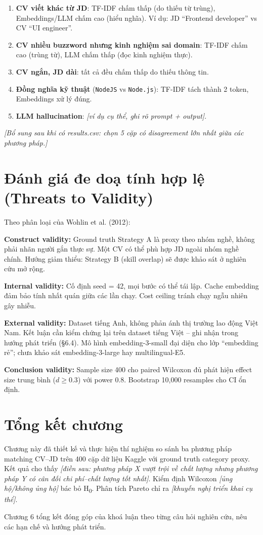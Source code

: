 \documentclass[a4paper,13pt]{report}
\begin{document}
\begin{enumerate}
    \item \textbf{CV viết khác từ JD}: TF-IDF chấm thấp (do thiếu từ trùng), Embeddings/LLM chấm cao (hiểu nghĩa). Ví dụ: JD ``Frontend developer'' vs CV ``UI engineer''.
    \item \textbf{CV nhiều buzzword nhưng kinh nghiệm sai domain}: TF-IDF chấm cao (trùng từ), LLM chấm thấp (đọc kinh nghiệm thực).
    \item \textbf{CV ngắn, JD dài}: tất cả đều chấm thấp do thiếu thông tin.
    \item \textbf{Đồng nghĩa kỹ thuật} (\texttt{NodeJS} vs \texttt{Node.js}): TF-IDF tách thành 2 token, Embeddings xử lý đúng.
    \item \textbf{LLM hallucination}: \textit{[ví dụ cụ thể, ghi rõ prompt + output]}.
\end{enumerate}

\textit{[Bổ sung sau khi có results.csv: chọn 5 cặp có disagreement lớn nhất giữa các phương pháp.]}

\section{Đánh giá đe doạ tính hợp lệ (Threats to Validity)}
\label{sec:threats}

Theo phân loại của Wohlin et al. (2012):

\textbf{Construct validity:} Ground truth Strategy A là proxy theo nhóm nghề, không phải nhãn người gắn thực sự. Một CV có thể phù hợp JD ngoài nhóm nghề chính. Hướng giảm thiểu: Strategy B (skill overlap) sẽ được khảo sát ở nghiên cứu mở rộng.

\textbf{Internal validity:} Cố định seed = 42, mọi bước có thể tái lập. Cache embedding đảm bảo tính nhất quán giữa các lần chạy. Cost ceiling tránh chạy ngẫu nhiên gây nhiễu.

\textbf{External validity:} Dataset tiếng Anh, không phản ánh thị trường lao động Việt Nam. Kết luận cần kiểm chứng lại trên dataset tiếng Việt -- ghi nhận trong hướng phát triển (\S 6.4). Mô hình embedding-3-small đại diện cho lớp ``embedding rẻ''; chưa khảo sát embedding-3-large hay multilingual-E5.

\textbf{Conclusion validity:} Sample size 400 cho paired Wilcoxon đủ phát hiện effect size trung bình ($d \geq 0.3$) với power 0.8. Bootstrap 10,000 resamples cho CI ổn định.

\section{Tổng kết chương}

Chương này đã thiết kế và thực hiện thí nghiệm so sánh ba phương pháp matching CV--JD trên 400 cặp dữ liệu Kaggle với ground truth category proxy. Kết quả cho thấy \textit{[điền sau: phương pháp X vượt trội về chất lượng nhưng phương pháp Y có cân đối chi phí--chất lượng tốt nhất]}. Kiểm định Wilcoxon \textit{[ủng hộ/không ủng hộ]} bác bỏ H\textsubscript{0}. Phân tích Pareto chỉ ra \textit{[khuyến nghị triển khai cụ thể]}.

Chương 6 tổng kết đóng góp của khoá luận theo từng câu hỏi nghiên cứu, nêu các hạn chế và hướng phát triển.
\end{document}
